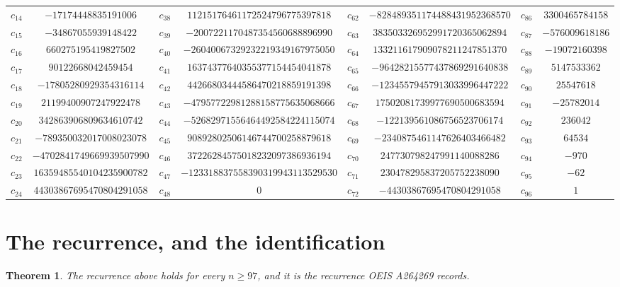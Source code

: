 \documentclass[11pt,a4paper]{article}
\theoremstyle{plain}
\newtheorem{theorem}{Theorem}
\theoremstyle{definition}
\begin{document}
\begin{center}
\begin{tabular}{cccccccc}
$c_{14}$ & $-17174448835191006$ & $c_{38}$ & $11215176461172524796775397818$ & $c_{62}$ & $-828489351174488431952368570$ & $c_{86}$ & $3300465784158$ \\
$c_{15}$ & $-34867055939148422$ & $c_{39}$ & $-2007221170487354560688896990$ & $c_{63}$ & $383503326952991720365062894$ & $c_{87}$ & $-576009618186$ \\
$c_{16}$ & $660275195419827502$ & $c_{40}$ & $-26040067329232219349167975050$ & $c_{64}$ & $133211617909078211247851370$ & $c_{88}$ & $-19072160398$ \\
$c_{17}$ & $90122668042459454$ & $c_{41}$ & $16374377640355377154454041878$ & $c_{65}$ & $-96428215577437869291640838$ & $c_{89}$ & $5147533362$ \\
$c_{18}$ & $-17805280929354316114$ & $c_{42}$ & $44266803444586470218859191398$ & $c_{66}$ & $-12345579457913033996447222$ & $c_{90}$ & $25547618$ \\
$c_{19}$ & $21199400907247922478$ & $c_{43}$ & $-47957722981288158775635068666$ & $c_{67}$ & $17502081739977690500683594$ & $c_{91}$ & $-25782014$ \\
$c_{20}$ & $342863906809634610742$ & $c_{44}$ & $-52682971556464492584224115074$ & $c_{68}$ & $-122139561086756523706174$ & $c_{92}$ & $236042$ \\
$c_{21}$ & $-789350032017008023078$ & $c_{45}$ & $90892802506146744700258879618$ & $c_{69}$ & $-2340875461147626403466482$ & $c_{93}$ & $64534$ \\
$c_{22}$ & $-4702841749669939507990$ & $c_{46}$ & $37226284575018232097386936194$ & $c_{70}$ & $247730798247991140088286$ & $c_{94}$ & $-970$ \\
$c_{23}$ & $16359485540104235900782$ & $c_{47}$ & $-123318837558390319943113529530$ & $c_{71}$ & $230478295837205752238090$ & $c_{95}$ & $-62$ \\
$c_{24}$ & $44303867695470804291058$ & $c_{48}$ & $0$ & $c_{72}$ & $-44303867695470804291058$ & $c_{96}$ & $1$ \\
\end{tabular}
\end{center}

\section{The recurrence, and the identification}

\begin{theorem}
The recurrence above holds for every $n\ge97$, and it is the recurrence OEIS A264269 records.
\end{theorem}
\end{document}

